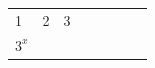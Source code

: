 {\begin{tabular}[t]{|l|l|l|l|l|l|l|l|}
    
        1 &
    
    
        2 &
    
    
        3%
     \tabularnewline\cline{1-1}\cline{2-2}\cline{3-3}\cline{4-4}\cline{5-5}\cline{6-6}\cline{7-7}\cline{8-8}
    
    
        
                \begin{math}{3}^{x}\end{math}
               &
    
    
         &
    
    
         &
    
    
         &
    
    
         &
    

\end{tabular}}
